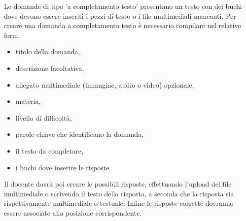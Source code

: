 \documentclass[a4paper, titlepage]{article}
\begin{document}
	 Le domande di tipo 'a completamento testo' presentano un testo con dei buchi dove devono essere inseriti i pezzi di testo o i file multimediali mancanti.
	 Per creare una domanda a completamento testo è necessario compilare nel relativo form:
	 \begin{itemize}
	 	\item titolo della domanda,
	 	\item descrizione facoltativa,
	 	\item allegato multimediale (immagine, audio o video) opzionale,
	 	\item materia,
	 	\item livello di difficoltà,
	 	\item parole chiave che identificano la domanda,
	 	\item il testo da completare,
	 	\item i buchi dove inserire le risposte.
	 \end{itemize}
	 Il docente dovrà poi creare le possibili risposte, effettuando l'upload del file multimediale o scrivendo il testo della risposta, a seconda che la risposta sia rispettivamente multimediale o testuale. Infine le risposte corrette dovranno essere associate alla posizione corrispondente. 	 
	 
	 \newpage
\end{document}
